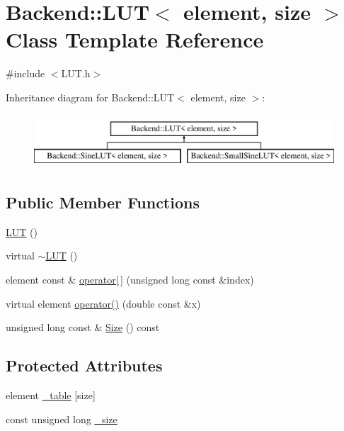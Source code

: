 \hypertarget{classBackend_1_1LUT}{\section{Backend\+:\+:L\+U\+T$<$ element, size $>$ Class Template Reference}
\label{classBackend_1_1LUT}
}


{\ttfamily \#include $<$L\+U\+T.\+h$>$}

Inheritance diagram for Backend\+:\+:L\+U\+T$<$ element, size $>$\+:\begin{figure}[H]
\begin{center}
\leavevmode
\includegraphics[height=2.000000cm]{classBackend_1_1LUT}
\end{center}
\end{figure}
\subsection*{Public Member Functions}
\begin{DoxyCompactItemize}
\item 
\hyperlink{classBackend_1_1LUT_a8541a1794b0eef2e15eadcfab8cdb12f}{L\+U\+T} ()
\item 
virtual \hyperlink{classBackend_1_1LUT_a1c4d93f58ba28397417f71f436740034}{$\sim$\+L\+U\+T} ()
\item 
element const \& \hyperlink{classBackend_1_1LUT_a9a7c75f36c72778098a091db3269c29c}{operator\mbox{[}$\,$\mbox{]}} (unsigned long const \&index)
\item 
virtual element \hyperlink{classBackend_1_1LUT_aea3420a7a3552f38ba8f9ea979bab764}{operator()} (double const \&x)
\item 
unsigned long const \& \hyperlink{classBackend_1_1LUT_a3ab84f04569e89cd6046da599c6edbae}{Size} () const 
\end{DoxyCompactItemize}
\subsection*{Protected Attributes}
\begin{DoxyCompactItemize}
\item 
element \hyperlink{classBackend_1_1LUT_ae70f3f0c9aaa9e0b85517d8e2c61d9a5}{\+\_\+table} \mbox{[}size\mbox{]}
\item 
const unsigned long \hyperlink{classBackend_1_1LUT_a94d2ce1a7c644ce2d4f8e905790b9b54}{\+\_\+size}
\end{DoxyCompactItemize}


